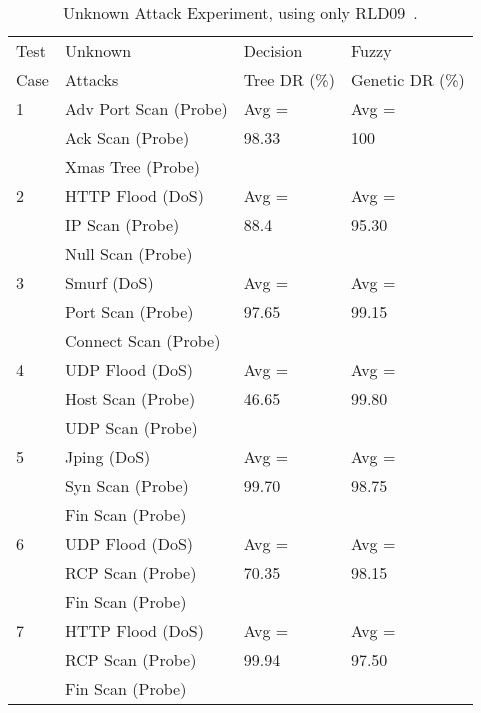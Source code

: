 \documentclass{sig-alternate}
\begin{document}
\begin{table}
\caption{Unknown Attack Experiment, using only RLD09~\cite{6496342}.}
\vspace{0.20cm}
\begin{tabular}{llll}
Test & Unknown & Decision & Fuzzy\\
Case & Attacks & Tree DR (\%)  & Genetic DR (\%)\\ \hline

1 & Adv Port Scan (Probe) & Avg = & Avg =\\
  & Ack Scan (Probe)		  & 98.33 & 100\\
  & Xmas Tree (Probe)		  &		  &\\ \hline

2 & HTTP Flood (DoS) & Avg = & Avg =\\
  & IP Scan (Probe)		& 88.4 & 95.30\\
  & Null Scan (Probe)	&		  &\\ \hline

3 & Smurf (DoS) & Avg = & Avg =\\
  & Port Scan (Probe)		& 97.65 & 99.15\\
  & Connect Scan (Probe)	&		  &\\ \hline

4 & UDP Flood (DoS) & Avg = & Avg =\\
  & Host Scan (Probe) & 46.65 & 99.80\\
  & UDP Scan (Probe)  &       &\\ \hline

5 & Jping (DoS)    & Avg =          & Avg =\\
  & Syn Scan (Probe) & 99.70 & 98.75\\
  & Fin Scan (Probe) &                &\\ \hline

6 & UDP Flood (DoS) & Avg = & Avg =\\
  & RCP Scan (Probe)  & 70.35 & 98.15\\
  & Fin Scan (Probe)  &       &\\ \hline

7 & HTTP Flood (DoS) & Avg =          & Avg =\\
  & RCP Scan (Probe)  & 99.94 & 97.50\\
  & Fin Scan (Probe) &                &\\
\hline\end{tabular}
\label{tab:fuzGenExp2}
\end{table}
\end{document}
